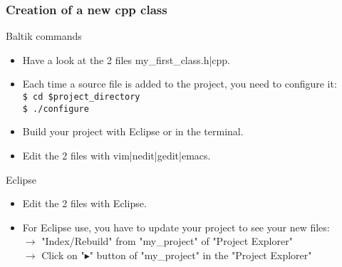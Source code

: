 \documentclass[10pt, hyperref={unicode=true,pdfusetitle, bookmarks=true,bookmarksnumbered=false,bookmarksopen=false, breaklinks=false,pdfborder={0 0 1},backref=true,colorlinks=true,linkcolor=darkblue,pageanchor, urlcolor=darkblue}]{beamer}
\begin{document}
\begin{frame}
\frametitle{Creation of a new cpp class}

\begin{block}{Baltik commands}
\begin{itemize}
\item Have a look at the 2 files my\_first\_class.h|cpp.\\

\item Each time a source file is added to the project, you need to configure it:\\
\texttt{\$ cd \$project\_directory}\\
\texttt{\$ ./configure}

\item Build your project with Eclipse or in the terminal.

\item Edit the 2 files with vim|nedit|gedit|emacs.
\end{itemize}
\end{block}

\begin{exampleblock}{Eclipse}
\begin{itemize}
\item Edit the 2 files with Eclipse.

\item For Eclipse use, you have to update your project to see your new files:\\
$\rightarrow$ "Index/Rebuild" from "my\_project" of "Project Explorer"\\
$\rightarrow$ Click on "$\blacktriangleright$" button of "my\_project" in the "Project Explorer"

\end{itemize}
\end{exampleblock}
\end{frame}
\end{document}
